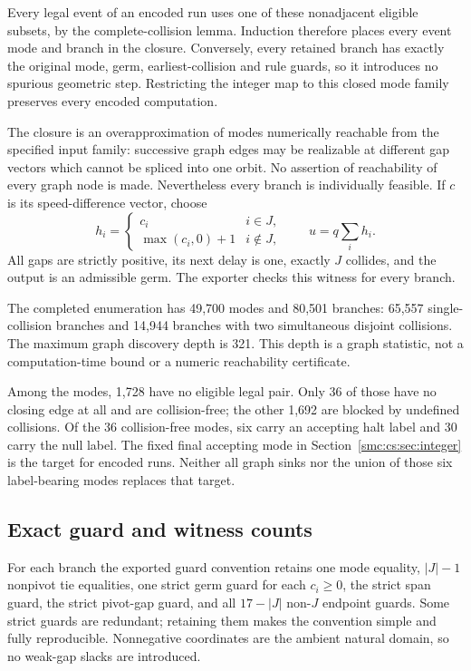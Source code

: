 \documentclass[11pt,letterpaper]{article}
\numberwithin{equation}{section}
\theoremstyle{definition}
\theoremstyle{remark}
\begin{document}
Every legal event of an encoded run uses one of these nonadjacent eligible subsets, by the complete-collision lemma. Induction therefore places every event mode and branch in the closure. Conversely, every retained branch has exactly the original mode, germ, earliest-collision and rule guards, so it introduces no spurious geometric step. Restricting the integer map to this closed mode family preserves every encoded computation.

The closure is an overapproximation of modes numerically reachable from the specified input family: successive graph edges may be realizable at different gap vectors which cannot be spliced into one orbit. No assertion of reachability of every graph node is made. Nevertheless every branch is individually feasible. If $c$ is its speed-difference vector, choose
\[
 h_i=\begin{cases}c_i&i\in J,\\ \max(c_i,0)+1&i\notin J,\end{cases}
 \qquad u=q\sum_i h_i.
\]
All gaps are strictly positive, its next delay is one, exactly $J$ collides, and the output is an admissible germ. The exporter checks this witness for every branch.

The completed enumeration has 49,700 modes and 80,501 branches: 65,557 single-collision branches and 14,944 branches with two simultaneous disjoint collisions. The maximum graph discovery depth is 321. This depth is a graph statistic, not a computation-time bound or a numeric reachability certificate.

Among the modes, 1,728 have no eligible legal pair. Only 36 of those have no closing edge at all and are collision-free; the other 1,692 are blocked by undefined collisions. Of the 36 collision-free modes, six carry an accepting halt label and 30 carry the null label. The fixed final accepting mode in Section~\ref{smc:cs:sec:integer} is the target for encoded runs. Neither all graph sinks nor the union of those six label-bearing modes replaces that target.

\subsection{Exact guard and witness counts}
For each branch the exported guard convention retains one mode equality, $|J|-1$ nonpivot tie equalities, one strict germ guard for each $c_i\ge0$, the strict span guard, the strict pivot-gap guard, and all $17-|J|$ non-$J$ endpoint guards. Some strict guards are redundant; retaining them makes the convention simple and fully reproducible. Nonnegative coordinates are the ambient natural domain, so no weak-gap slacks are introduced.
\end{document}
